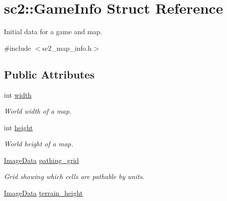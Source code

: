 \hypertarget{structsc2_1_1_game_info}{}\section{sc2\+:\+:Game\+Info Struct Reference}
\label{structsc2_1_1_game_info}


Initial data for a game and map.  




{\ttfamily \#include $<$sc2\+\_\+map\+\_\+info.\+h$>$}

\subsection*{Public Attributes}
\begin{DoxyCompactItemize}
\item 
\mbox{\label{structsc2_1_1_game_info_a9b00972b55c4b963c79afe256919631f}} 
int \hyperlink{structsc2_1_1_game_info_a9b00972b55c4b963c79afe256919631f}{width}
\begin{DoxyCompactList}\small\item\em World width of a map. \end{DoxyCompactList}\item 
\mbox{\label{structsc2_1_1_game_info_a81e1a29b3074946432fff0d11ca6731f}} 
int \hyperlink{structsc2_1_1_game_info_a81e1a29b3074946432fff0d11ca6731f}{height}
\begin{DoxyCompactList}\small\item\em World height of a map. \end{DoxyCompactList}\item 
\mbox{\label{structsc2_1_1_game_info_a4eca87fbfd989b2a3c8ea3346d2c3677}} 
\hyperlink{structsc2_1_1_image_data}{Image\+Data} \hyperlink{structsc2_1_1_game_info_a4eca87fbfd989b2a3c8ea3346d2c3677}{pathing\+\_\+grid}
\begin{DoxyCompactList}\small\item\em Grid showing which cells are pathable by units. \end{DoxyCompactList}\item 
\mbox{\label{structsc2_1_1_game_info_af0b251e21f771f06ca1927c9dff2e43b}} 
\hyperlink{structsc2_1_1_image_data}{Image\+Data} \hyperlink{structsc2_1_1_game_info_af0b251e21f771f06ca1927c9dff2e43b}{terrain\+\_\+height}

\end{DoxyCompactItemize}
